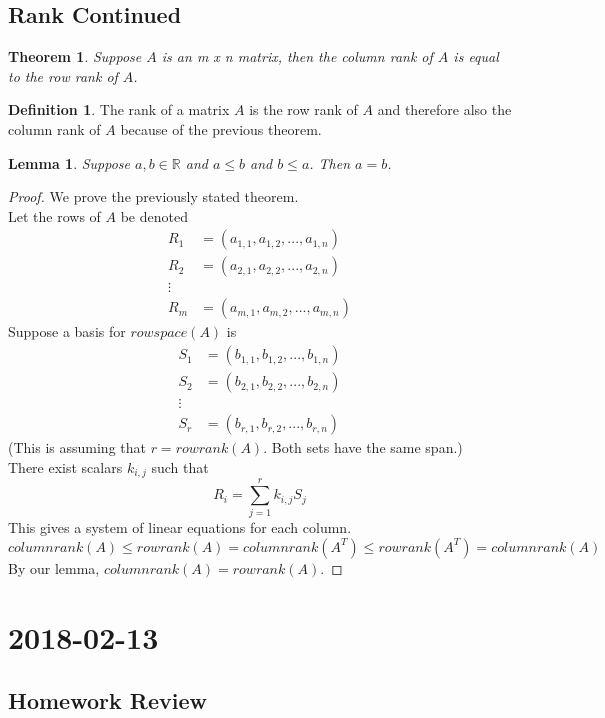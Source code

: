 \documentclass{report}
\theoremstyle{plain}
\newtheorem*{thrm}{Theorem}
\newtheorem*{lemma}{Lemma}
\theoremstyle{definition}
\newtheorem*{defn}{Definition}
\theoremstyle{plain}
\newcommand{\mychapter}[2]{
	\setcounter{chapter}{#1}
	\setcounter{section}{0}
	\chapter*{#2}
	\addcontentsline{toc}{chapter}{#2}
}
\begin{document}
\section{Rank Continued}
\begin{thrm}
Suppose $A$ is an m x n matrix, then the column rank of $A$ is equal to the row rank of $A$.
\end{thrm}
\begin{defn}
The rank of a matrix $A$ is the row rank of $A$ and therefore also the column rank of $A$ because of the previous theorem.
\end{defn}
\begin{lemma}
Suppose $a,b\in \mathbb{R}$ and $a\leq b$ and $b\leq a$. Then $a=b$.
\end{lemma}
\begin{proof}
We prove the previously stated theorem.\\
Let the rows of $A$ be denoted
\begin{align*}
R_1 &= (a_{1,1},a_{1,2}, ..., a_{1,n})\\
R_2 &= (a_{2,1},a_{2,2}, ..., a_{2,n})\\
\vdots\\
R_m &= (a_{m,1},a_{m,2}, ..., a_{m,n})
\end{align*}
Suppose a basis for $rowspace(A)$ is
\begin{align*}
S_1 &= (b_{1,1},b_{1,2}, ..., b_{1,n})\\
S_2 &= (b_{2,1},b_{2,2}, ..., b_{2,n})\\
\vdots\\
S_r &= (b_{r,1},b_{r,2}, ..., b_{r,n})
\end{align*}
(This is assuming that $r=rowrank(A)$. Both sets have the same span.)\\
There exist scalars $k_{i,j}$ such that
\[ R_i = \sum_{j=1}^rk_{i,j}S_j \]
This gives a system of linear equations for each column.
\[ columnrank(A) \leq rowrank(A) = columnrank(A^T) \leq rowrank(A^T) = columnrank(A) \]
By our lemma, $columnrank(A) = rowrank(A)$.
\end{proof}

\mychapter{15}{2018-02-13}
\section{Homework Review}
\end{document}
